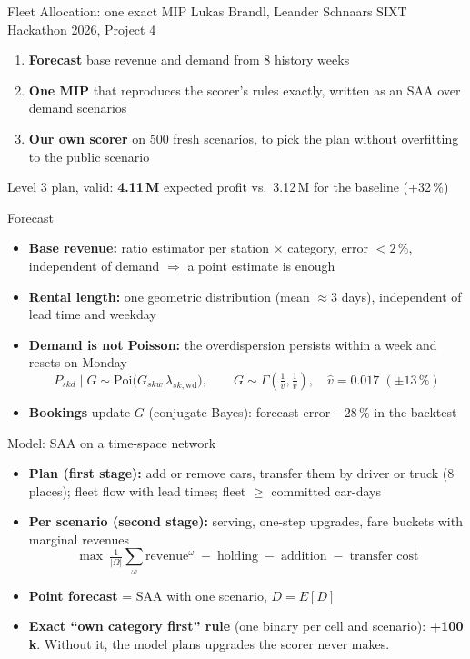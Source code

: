 \documentclass[aspectratio=169,11pt]{beamer}
\begin{document}
\begin{frame}{Fleet Allocation: one exact MIP}
\small Lukas Brandl, Leander Schnaars \textbullet{} SIXT Hackathon 2026, Project 4
\vspace{1em}
\normalsize
\begin{enumerate}
  \item \textbf{Forecast} base revenue and demand from 8 history weeks
  \item \textbf{One MIP} that reproduces the scorer's rules exactly, written as an SAA over demand scenarios
  \item \textbf{Our own scorer} on 500 fresh scenarios, to pick the plan without overfitting to the public scenario
\end{enumerate}
\vspace{1em}
Level 3 plan, valid: \textbf{4.11\,M} expected profit vs.\ 3.12\,M for the baseline (+32\,\%)
\end{frame}

\begin{frame}{Forecast}
\begin{itemize}
  \item \textbf{Base revenue:} ratio estimator per station $\times$ category, error $<2\,\%$, independent of demand $\Rightarrow$ a point estimate is enough
  \item \textbf{Rental length:} one geometric distribution (mean $\approx 3$ days), independent of lead time and weekday
  \item \textbf{Demand is not Poisson:} the overdispersion persists within a week and resets on Monday
  \[
  P_{skd}\mid G\sim\mathrm{Poi}\big(G_{skw}\,\lambda_{sk,\mathrm{wd}}\big),\qquad G\sim\Gamma(\tfrac1v,\tfrac1v),\quad \hat v=0.017\;(\pm13\,\%)
  \]
  \item \textbf{Bookings} update $G$ (conjugate Bayes): forecast error $-28\,\%$ in the backtest
\end{itemize}
\end{frame}

\begin{frame}{Model: SAA on a time-space network}
\begin{itemize}
  \item \textbf{Plan (first stage):} add or remove cars, transfer them by driver or truck (8 places); fleet flow with lead times; fleet $\ge$ committed car-days
  \item \textbf{Per scenario (second stage):} serving, one-step upgrades, fare buckets with marginal revenues
  \[
  \max\ \tfrac{1}{|\Omega|}\textstyle\sum_\omega \text{revenue}^\omega\;-\;\text{holding}\;-\;\text{addition}\;-\;\text{transfer cost}
  \]
  \item \textbf{Point forecast} = SAA with one scenario, $D = E[D]$
  \item \textbf{Exact ``own category first'' rule} (one binary per cell and scenario): \textbf{+100\,k}. Without it, the model plans upgrades the scorer never makes.
\end{itemize}
\end{frame}
\end{document}
